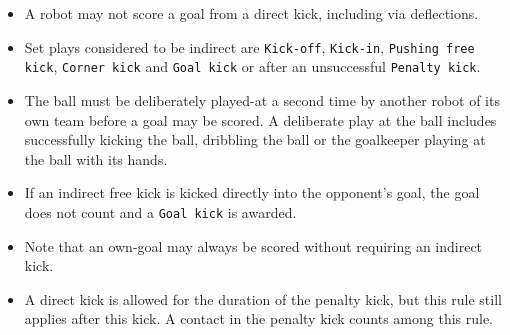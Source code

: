 \begin{itemize}
  \item A robot may not score a goal from a direct kick, including via deflections.
  \item Set plays considered to be indirect are \texttt{Kick-off}, \texttt{Kick-in}, \texttt{Pushing free kick}, \texttt{Corner kick} and \texttt{Goal kick} or after an unsuccessful \texttt{Penalty kick}.
  \item The ball must be deliberately played-at a second time by another robot of its own team before a goal may be scored.
    A deliberate play at the ball includes successfully kicking the ball, dribbling the ball or the goalkeeper playing at the ball with its hands.
  \item If an indirect free kick is kicked directly into the opponent's goal, the goal does not count and a \texttt{Goal kick} is awarded.
  \item Note that an own-goal may always be scored without requiring an indirect kick.
  \item A direct kick is allowed for the duration of the penalty kick, but this rule still applies after this kick. A contact in the penalty kick counts among this rule.
\end{itemize}

